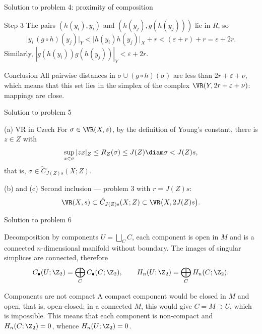 \documentclass[aspectratio=169,11pt]{beamer}
\begin{document}
\begin{frame}{Solution to problem \textup{4}: proximity of composition}
\begin{block}{Step \textup{3}}
The pairs $(h(y_i),y_i)$ and $(h(y_j), g(h(y_j)))$ lie in $R$, so
\[
\bigl|y_i\, (g\circ h)(y_j)\bigr|_Y < \bigl|h(y_i)h(y_j)\bigr|_X + r < (\varepsilon + r) + r = \varepsilon + 2r .
\]
Similarly, $|g(h(y_i)) g(h(y_j))|_Y < \varepsilon + 2r$.
\end{block}
\begin{block}{Conclusion}
All pairwise distances in $\sigma \cup (g\circ h)(\sigma)$ are less than $2r+\varepsilon+\nu$, which means that this set lies in the simplex of the complex $\VR(Y, 2r+\varepsilon+\nu)$\textup{:} mappings are close.
\end{block}
\end{frame}

\begin{frame}{Solution to problem \textup{5}}
\begin{block}{\textup{(a)} VR in Czech}
For $\sigma \in \VR(X,s)$, by the definition of Young's constant, there is $z \in Z$ with
\[
\sup_{x\in\sigma}|zx|_Z \le R_Z(\sigma) \le J(Z)\diam\sigma < J(Z)s,
\]
that is, $\sigma \in \check C_{J(Z)s}(X;Z)$.
\end{block}
\begin{block}{\textup{(b)} and \textup{(c)}}
Second inclusion --- problem \textup{3} with $r = J(Z)s$\textup{:}
\[
\VR(X,s) \subset \check C_{J(Z)s}(X;Z) \subset \VR\bigl(X, 2J(Z)s\bigr).
\]
\end{block}
\end{frame}

\begin{frame}{Solution to problem \textup{6}}
\begin{block}{Decomposition by components}
$U = \bigsqcup_C C$, each component is open in $M$ and is a connected $n$-dimensional manifold without boundary. The images of singular simplices are connected, therefore
\[
C_\bullet(U;\Z_2) = \bigoplus_C C_\bullet(C;\Z_2), \qquad H_n(U;\Z_2) = \bigoplus_C H_n(C;\Z_2).
\]
\end{block}
\begin{block}{Components are not compact}
A compact component would be closed in $M$ and open, that is, open-closed\textup{;} in a connected $M$, this would give $C = M \supset U$, which is impossible. This means that each component is non-compact and $H_n(C;\Z_2) = 0$, whence $H_n(U;\Z_2) = 0$.
\end{block}
\end{frame}
\end{document}
